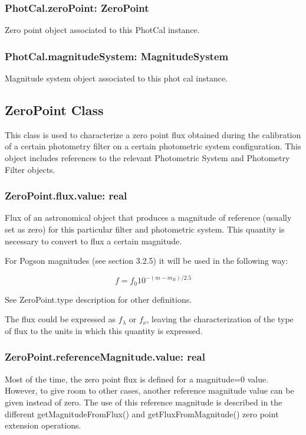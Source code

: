 \documentclass[11pt,a4paper]{ivoa}
\begin{document}
\subsubsection{PhotCal.zeroPoint: ZeroPoint}
Zero point object associated to this PhotCal instance.
\par

\subsubsection{PhotCal.magnitudeSystem: MagnitudeSystem}
Magnitude system object associated to this phot cal instance.
\par

\subsection{ZeroPoint Class}
This class is used to characterize a zero point flux obtained during the
calibration of a certain photometry filter on a certain photometric system
configuration. This object includes references to the relevant Photometric
System and Photometry Filter objects.
\par

\subsubsection{ZeroPoint.flux.value: real}
Flux of an astronomical object that produces a magnitude of reference
(usually set as zero) for this particular filter and photometric system.
This quantity is necessary to convert to flux a certain magnitude.
\par

For Pogson magnitudes (see section 3.2.5) it will be used in the following way:
\par
\begin{equation} \label{eq:24}
f = f_0 10^{-(m-m_R )/2.5}
\end{equation}

See ZeroPoint.type description for other definitions.
\par

The flux could be expressed as $f_{\lambda}$ or $f_{\nu}$, leaving the
characterization of the type of flux to the units in which this quantity
is expressed.
\par

\subsubsection{ZeroPoint.referenceMagnitude.value: real}
Most of the time, the zero point flux is defined for a magnitude=0 value.
However, to give room to other cases, another reference magnitude value can
be given instead of zero. The use of this reference magnitude is described in
the different getMagnitudeFromFlux() and getFluxFromMagnitude() zero point
extension operations.
\par
\end{document}
